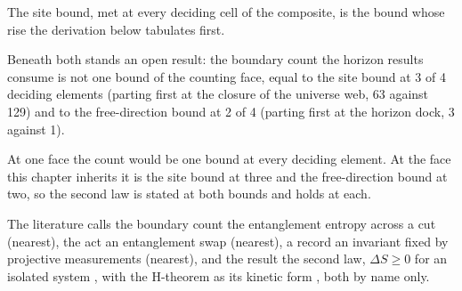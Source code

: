 The site bound, met at every deciding cell of the composite, is the bound whose rise the derivation below tabulates first.
\begin{chwall}\label{box:XI-1-second-law-as-the-boundary-count-under-acts:3}
Beneath both stands an open result: the boundary count the horizon results consume is not one bound of the counting face, equal to the site bound at 3 of 4 deciding elements (parting first at the closure of the universe web, 63 against 129) and to the free-direction bound at 2 of 4 (parting first at the horizon dock, 3 against 1).
\end{chwall}
At one face the count would be one bound at every deciding element. At the face this chapter inherits it is the site bound at three and the free-direction bound at two, so the second law is stated at both bounds and holds at each.
\begin{chbridge}
The literature calls the boundary count the entanglement entropy across a cut (nearest), the act an entanglement swap (nearest), a record an invariant fixed by projective measurements (nearest), and the result the second law, $\Delta S \geq 0$ for an isolated system \cite{Clausius1865}, with the H-theorem as its kinetic form \cite{Boltzmann1872}, both by name only.
\end{chbridge}
